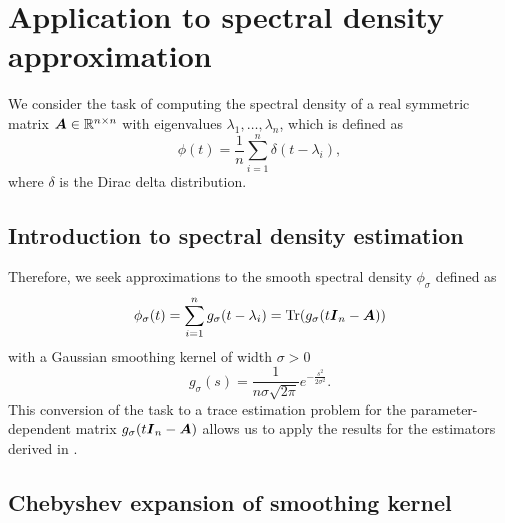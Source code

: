 \documentclass[12pt]{article}
\begin{document}
\section{Application to spectral density approximation}
\label{sec:application}

We consider the task of computing the spectral density of a real symmetric matrix $\boldsymbol{A} \in \mathbb{R}^{n \times n}$ with eigenvalues $\lambda_1, \dots, \lambda_n$, which is defined as
\begin{equation}
    \phi(t) = \frac{1}{n} \sum_{i=1}^{n} \delta(t - \lambda_i),
    \label{equ:spectral-density}
\end{equation}
where $\delta$ is the Dirac delta distribution.

\subsection{Introduction to spectral density estimation}
\label{subsec:spectral-density}

 Therefore, we seek approximations to the smooth spectral density $\phi_{\sigma}$ defined as
\begin{equation}
    \phi_{\sigma}(t) = \sum_{i=1}^{n} g_{\sigma}(t - \lambda_i) = \operatorname{Tr}(g_{\sigma}(t\boldsymbol{I}_n - \boldsymbol{A}))
    \label{equ:smooth-spectral-density}
\end{equation}
with a Gaussian smoothing kernel of width $\sigma > 0$
\begin{equation}
    g_{\sigma}(s) = \frac{1}{n \sigma \sqrt{2\pi}} e^{-\frac{s^2}{2\sigma^2}}.
    \label{equ:smoothing-kernel}
\end{equation}
This conversion of the task to a trace estimation problem for the parameter-dependent matrix $g_{\sigma}(t\boldsymbol{I}_n - \boldsymbol{A})$ allows us to apply the results for the estimators derived in .


\subsection{Chebyshev expansion of smoothing kernel}
\label{subsec:chebyshev-expansion}
\end{document}
